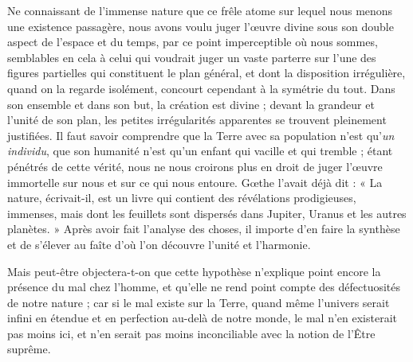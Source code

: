 \documentclass[a4paper, 11pt, oneside, landscape]{article}
\begin{document}
Ne connaissant de l'immense nature que ce frêle atome sur lequel nous menons une existence passagère, nous avons voulu juger l'œuvre divine sous son double aspect de l'espace et du temps, par ce point imperceptible où nous sommes, semblables en cela à celui qui voudrait juger un vaste parterre sur l'une des figures partielles qui constituent le plan général, et dont la disposition irrégulière, quand on la regarde isolément, concourt cependant à la symétrie du tout. Dans son ensemble et dans son but, la création est divine ; devant la grandeur et l'unité de son plan, les petites irrégularités apparentes se trouvent pleinement justifiées. Il faut savoir comprendre que la Terre avec sa population n'est qu'\emph{un individu}, que son humanité n'est qu'un enfant qui vacille et qui tremble ; étant pénétrés de cette vérité, nous ne nous croirons plus en droit de juger l'œuvre immortelle sur nous et sur ce qui nous entoure. Gœthe l'avait déjà dit : « La nature, écrivait-il, est un livre qui contient des révélations prodigieuses, immenses, mais dont les feuillets sont dispersés dans Jupiter, Uranus et les autres planètes. » Après avoir fait l'analyse des choses, il importe d'en faire la synthèse et de s'élever au faîte d'où l'on découvre l'unité et l'harmonie.

Mais peut-être objectera-t-on que cette hypothèse n'explique point encore la présence du mal chez l'homme, et qu'elle ne rend point compte des défectuosités de notre nature ; car si le mal existe sur la Terre, quand même l'univers serait infini en étendue et en perfection au-delà de notre monde, le mal n'en existerait pas moins ici, et n'en serait pas moins inconciliable avec la notion de l'Être suprême.
\end{document}
